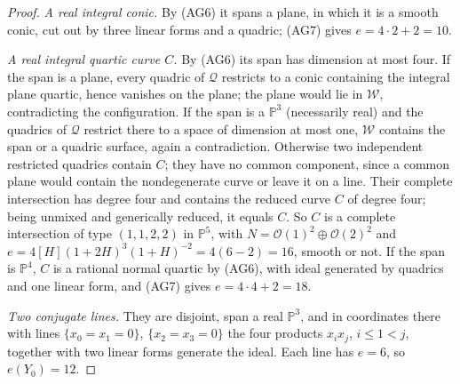 \begin{proof}
\emph{A real integral conic.} By (AG6) it spans a plane, in which it is a
smooth conic, cut out by three linear forms and a quadric; (AG7) gives
$e=4\cdot2+2=10$.

\emph{A real integral quartic curve $C$.} By (AG6) its span has dimension at
most four. If the span is a plane, every quadric of $\mathcal Q$ restricts to
a conic containing the integral plane quartic, hence vanishes on the plane;
the plane would lie in $\mathcal W$, contradicting the configuration. If the
span is a $\mathbb P^3$ (necessarily real) and the quadrics of $\mathcal Q$
restrict there to a space of dimension at most one, $\mathcal W$ contains the
span or a quadric surface, again a contradiction. Otherwise two independent
restricted quadrics contain $C$; they have no common component, since a common
plane would contain the nondegenerate curve or leave it on a line. Their
complete intersection has degree four and contains the reduced curve $C$ of
degree four; being unmixed and generically reduced, it equals $C$. So $C$ is a
complete intersection of type $(1,1,2,2)$ in $\mathbb P^5$, with
$N=\mathcal O(1)^2\oplus\mathcal O(2)^2$ and
$e=4[H](1+2H)^3(1+H)^{-2}=4(6-2)=16$, smooth or not. If the span is
$\mathbb P^4$, $C$ is a rational normal quartic by (AG6), with ideal generated
by quadrics and one linear form, and (AG7) gives $e=4\cdot4+2=18$.

\emph{Two conjugate lines.} They are disjoint, span a real $\mathbb P^3$, and
in coordinates there with lines $\{x_0=x_1=0\}$, $\{x_2=x_3=0\}$ the four
products $x_ix_j$, $i\le1<j$, together with two linear forms generate the
ideal. Each line has $e=6$, so $e(Y_0)=12$.


\end{proof}

